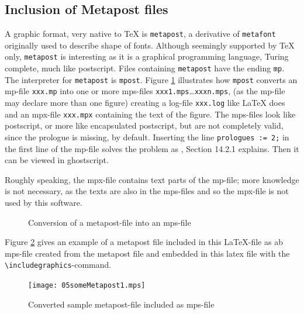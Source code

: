 \documentclass[12pt]{article}
\begin{document}
\subsection{Inclusion of Metapost files}\label{subsec:metapost}

A graphic format, very native to TeX is {\tt metapost}, 
a derivative of {\tt metafont} originally used to describe shape of fonts. 
Although seemingly supported by TeX only, 
{\tt metapost} is interesting as it is a graphical programming language, 
Turing complete, much like postscript. 
Files containing {\tt metapost} have the ending {\tt mp}. 
The interpreter for {\tt metapost} is {\tt mpost}. 
Figure \ref{fig:mp2mps} illustrates how {\tt mpost} converts an \gls{mp}-file 
{\tt xxx.mp} 
into one or more \gls{mps}-files {\tt xxx1.mps}\dots {\tt xxxn.mps}, 
(as the mp-file may declare more than one figure) 
creating a log-file {\tt xxx.log} like LaTeX does 
and an \gls{mpx}-file {\tt xxx.mpx} containing the text of the figure. 
The mps-files look like postscript, or more like encapsulated postscript, 
but are not completely valid, since the prologue is missing, by default. 
Inserting the line {\tt prologues := 2;} in the first line of the mp-file 
solves the problem as \cite{MPost}, Section 14.2.1 explains. 
Then it can be viewed in ghostscript. 

Roughly speaking, the mpx-file contains text parts of the mp-file; 
more knowledge is not necessary, as the texts are also in the mps-files 
and so the mpx-file is not used by this software. 

\begin{figure}[htb]
\begin{center}

\end{center}
\caption{\label{fig:mp2mps}Conversion of a metapost-file into an mps-file}
\end{figure}


Figure \ref{fig:metapost} gives an example of a metapost file 
included in this LaTeX-file as ab mps-file 
created from the metapost file 
and embedded in this latex file 
with the {\tt\textbackslash includegraphics}-command. 

\begin{figure}[htb]
\begin{center}
\texttt{[image: 05someMetapost1.mps]}
\end{center}
\caption{\label{fig:metapost}
Converted sample metapost-file included as mps-file  }
\end{figure}
\end{document}
